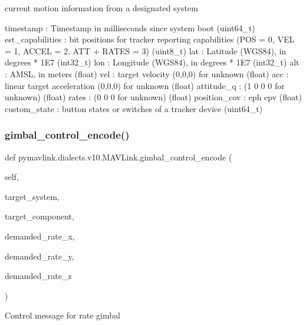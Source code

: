 \begin{DoxyVerb}
\begin{DoxyVerb}
\begin{DoxyVerb}current motion information from a designated system

timestamp                 : Timestamp in milliseconds since system boot (uint64_t)
est_capabilities          : bit positions for tracker reporting capabilities (POS = 0, VEL = 1, ACCEL = 2, ATT + RATES = 3) (uint8_t)
lat                       : Latitude (WGS84), in degrees * 1E7 (int32_t)
lon                       : Longitude (WGS84), in degrees * 1E7 (int32_t)
alt                       : AMSL, in meters (float)
vel                       : target velocity (0,0,0) for unknown (float)
acc                       : linear target acceleration (0,0,0) for unknown (float)
attitude_q                : (1 0 0 0 for unknown) (float)
rates                     : (0 0 0 for unknown) (float)
position_cov              : eph epv (float)
custom_state              : button states or switches of a tracker device (uint64_t)\end{DoxyVerb}
 \mbox{\label{classpymavlink_1_1dialects_1_1v10_1_1MAVLink_af1be95e61d1e7f5c24596a17c3be0868}} 
\subsubsection{\texorpdfstring{gimbal\+\_\+control\+\_\+encode()}{gimbal\_control\_encode()}}
{\footnotesize\ttfamily def pymavlink.\+dialects.\+v10.\+M\+A\+V\+Link.\+gimbal\+\_\+control\+\_\+encode (\begin{DoxyParamCaption}\item[{}]{self,  }\item[{}]{target\+\_\+system,  }\item[{}]{target\+\_\+component,  }\item[{}]{demanded\+\_\+rate\+\_\+x,  }\item[{}]{demanded\+\_\+rate\+\_\+y,  }\item[{}]{demanded\+\_\+rate\+\_\+z }\end{DoxyParamCaption})}

\begin{DoxyVerb}Control message for rate gimbal


\end{DoxyVerb}
\end{DoxyVerb}
\end{DoxyVerb}
